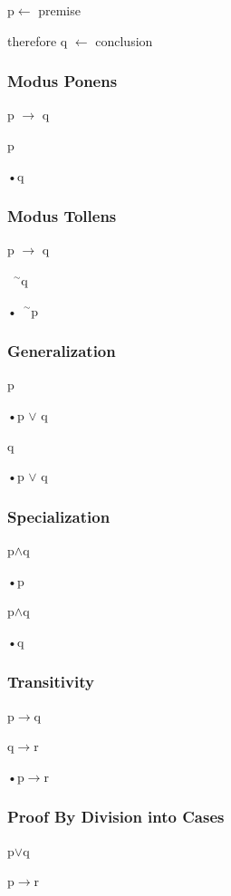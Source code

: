 \documentclass{article}
\newcommand{\negation}{${\phantom{0}}^\sim$}
\begin{document}
p\quad\quad\quad\quad\quad\quad\quad $\leftarrow$  premise

therefore q \quad\quad $\leftarrow$ conclusion

\subsubsection{Modus Ponens}
p $\rightarrow$ q

p

•q

\subsubsection{Modus Tollens}

p $\rightarrow$ q

\negation q

•\negation p

\subsubsection{Generalization}

p

•p $\vee$ q

\vspace{10pt}

q 

•p $\vee$ q

\subsubsection{Specialization}

p$\wedge$q

•p

\vspace{10pt}

p$\wedge$q

•q

\subsubsection{Transitivity}
p$\rightarrow$q

q$\rightarrow$r

•p$\rightarrow$r

\subsubsection{Proof By Division into Cases}
p$\vee$q

p$\rightarrow$r
\end{document}
